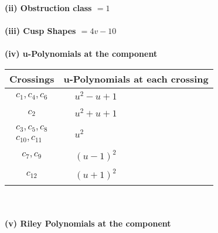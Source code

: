 \documentclass[1p]{elsarticle_modified}
\theoremstyle{definition}
\begin{document}
\flushleft \textbf{(ii) Obstruction class $= 1$}\\~\\
\flushleft \textbf{(iii) Cusp Shapes $= 4 v-10$}\\~\\
\newpage\renewcommand{\arraystretch}{1}
\flushleft \textbf{(iv) u-Polynomials at the component}\newline \\
\begin{tabular}{m{50pt}|m{274pt}}
Crossings & \hspace{64pt}u-Polynomials at each crossing \\
\hline $$\begin{aligned}c_{1},c_{4},c_{6}\end{aligned}$$&$\begin{aligned}
&u^2- u+1
\end{aligned}$\\
\hline $$\begin{aligned}c_{2}\end{aligned}$$&$\begin{aligned}
&u^2+u+1
\end{aligned}$\\
\hline $$\begin{aligned}c_{3},c_{5},c_{8}\\c_{10},c_{11}\end{aligned}$$&$\begin{aligned}
&u^2
\end{aligned}$\\
\hline $$\begin{aligned}c_{7},c_{9}\end{aligned}$$&$\begin{aligned}
&(u-1)^2
\end{aligned}$\\
\hline $$\begin{aligned}c_{12}\end{aligned}$$&$\begin{aligned}
&(u+1)^2
\end{aligned}$\\
\hline
\end{tabular}\\~\\
\newpage\renewcommand{\arraystretch}{1}
\flushleft \textbf{(v) Riley Polynomials at the component}\newline \\
\end{document}
